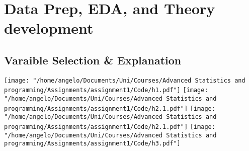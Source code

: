 \documentclass[a4paper]{article}
\begin{document}
\section{Data Prep, EDA, and Theory development}
\subsection{Varaible Selection \& Explanation}


\texttt{[image: "/home/angelo/Documents/Uni/Courses/Advanced Statistics and programming/Assignments/assignment1/Code/h1.pdf"]}
\texttt{[image: "/home/angelo/Documents/Uni/Courses/Advanced Statistics and programming/Assignments/assignment1/Code/h2.1.pdf"]}
\texttt{[image: "/home/angelo/Documents/Uni/Courses/Advanced Statistics and programming/Assignments/assignment1/Code/h2.1.pdf"]}
\texttt{[image: "/home/angelo/Documents/Uni/Courses/Advanced Statistics and programming/Assignments/assignment1/Code/h3.pdf"]}



\begin{center}
\end{center}
\end{document}
